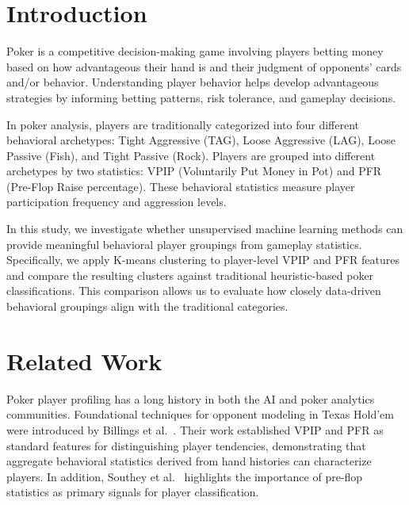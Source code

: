 \documentclass[sigconf]{acmart}
\begin{document}
\maketitle

\section{Introduction}
Poker is a competitive decision-making game involving players betting money based on how advantageous their hand is and their judgment of opponents' cards and/or behavior. Understanding player behavior helps develop advantageous strategies by informing betting patterns, risk tolerance, and gameplay decisions.

In poker analysis, players are traditionally categorized into four different behavioral archetypes: Tight Aggressive (TAG), Loose Aggressive (LAG), Loose Passive (Fish), and Tight Passive (Rock). Players are grouped into different archetypes by two statistics: VPIP (Voluntarily Put Money in Pot) and PFR (Pre-Flop Raise percentage). These behavioral statistics measure player participation frequency and aggression levels.

In this study, we investigate whether unsupervised machine learning methods can provide meaningful behavioral player groupings from gameplay statistics. Specifically, we apply K-means clustering to player-level VPIP and PFR features and compare the resulting clusters against traditional heuristic-based poker classifications. This comparison allows us to evaluate how closely data-driven behavioral groupings align with the traditional categories.

\section{Related Work}
Poker player profiling has a long history in both the AI and poker analytics communities. Foundational techniques for opponent modeling in Texas Hold'em were introduced by Billings et al.~\cite{billings2002challenge}. Their work established VPIP and PFR as standard features for distinguishing player tendencies, demonstrating that aggregate behavioral statistics derived from hand histories can characterize players. In addition, Southey et al.~\cite{southey2005bayes} highlights the importance of pre-flop statistics as primary signals for player classification. 
\end{document}
